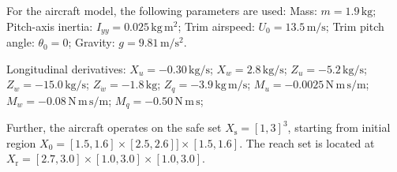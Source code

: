 \documentclass[journal,twoside,web]{ieeecolor}
\newcommand{\safe}{\mathrm{s}}
\newcommand{\reach}{\mathrm{r}}
\theoremstyle{definition}
\theoremstyle{plain}
\theoremstyle{plain}
\begin{document}
For the aircraft model, the following parameters are used:  
Mass: $m = 1.9\,\mathrm{kg}$; \quad 
Pitch-axis inertia: $I_{yy} = 0.025\,\mathrm{kg\,m^2}$; \quad
Trim airspeed: $U_0 = 13.5\,\mathrm{m/s}$; \quad
Trim pitch angle: $\theta_0 = 0$; \quad
Gravity: $g = 9.81\,\mathrm{m/s^2}$.
    
Longitudinal derivatives:
$X_u = -0.30\,\mathrm{kg/s}$; \quad
$X_w = 2.8\,\mathrm{kg/s}$; \quad
$Z_u = -5.2\,\mathrm{kg/s}$; \quad
$Z_w = -15.0\,\mathrm{kg/s}$; \quad
$Z_{\dot w} = -1.8\,\mathrm{kg}$; \quad
$Z_q = -3.9\,\mathrm{kg\,m/s}$; \quad
$M_u = -0.0025\,\mathrm{N\,m\,s/m}$; \quad
$M_w = -0.08\,\mathrm{N\,m\,s/m}$; \quad
$M_q = -0.50\,\mathrm{N\,m\,s}$; \quad

Further, the aircraft operates on the safe set $X_\safe = [1, 3]^3$, starting from initial region
$X_0 = [1.5, 1.6] \times [2.5, 2.6]] \times [1.5, 1.6]$. The reach set is located at $X_\reach = [2.7, 3.0] \times [1.0, 3.0] \times [1.0, 3.0]$.


\end{document}
